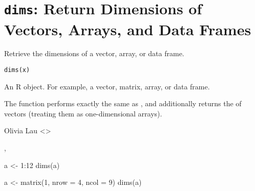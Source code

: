  \section{{\tt dims}: Return Dimensions of Vectors, Arrays, and Data Frames}\label{ss:dims}
\begin{Description}\relax
Retrieve the dimensions of a vector, array, or data frame.
\end{Description}
\begin{Usage}
\begin{verbatim}
dims(x)
\end{verbatim}
\end{Usage}
\begin{Arguments}
\begin{ldescription}
\item[\code{x}] An R object.  For example, a vector, matrix, array, or data 
frame.
\end{ldescription}
\end{Arguments}
\begin{Value}
The function  performs exactly the same as , and 
additionally returns the  of vectors (treating them as 
one-dimensional arrays).
\end{Value}
\begin{Author}\relax
Olivia Lau <>
\end{Author}
\begin{SeeAlso}\relax
{}, 
\end{SeeAlso}
\begin{Examples}
\begin{ExampleCode}
a <- 1:12
dims(a)

a <- matrix(1, nrow = 4, ncol = 9)
dims(a)
\end{ExampleCode}
\end{Examples}



